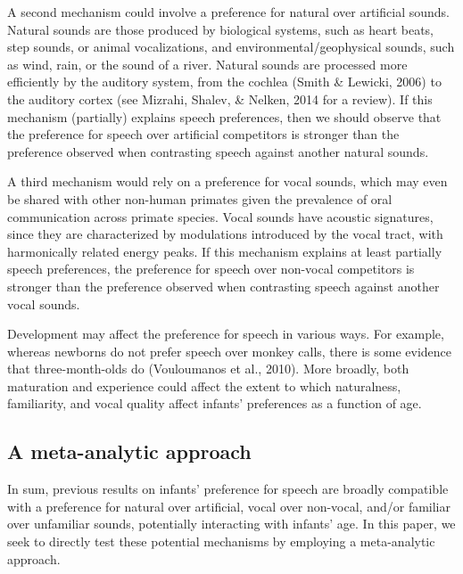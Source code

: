 \documentclass[man]{apa6}
\begin{document}
A second mechanism could involve a preference for natural over artificial sounds. Natural sounds are those produced by biological systems, such as heart beats, step sounds, or animal vocalizations, and environmental/geophysical sounds, such as wind, rain, or the sound of a river. Natural sounds are processed more efficiently by the auditory system, from the cochlea (Smith \& Lewicki, 2006) to the auditory cortex (see Mizrahi, Shalev, \& Nelken, 2014 for a review). If this mechanism (partially) explains speech preferences, then we should observe that the preference for speech over artificial competitors is stronger than the preference observed when contrasting speech against another natural sounds.

A third mechanism would rely on a preference for vocal sounds, which may even be shared with other non-human primates given the prevalence of oral communication across primate species. Vocal sounds have acoustic signatures, since they are characterized by modulations introduced by the vocal tract, with harmonically related energy peaks. If this mechanism explains at least partially speech preferences, the preference for speech over non-vocal competitors is stronger than the preference observed when contrasting speech against another vocal sounds.

Development may affect the preference for speech in various ways. For example, whereas newborns do not prefer speech over monkey calls, there is some evidence that three-month-olds do (Vouloumanos et al., 2010). More broadly, both maturation and experience could affect the extent to which naturalness, familiarity, and vocal quality affect infants' preferences as a function of age.

\hypertarget{a-meta-analytic-approach}{%
\subsection{A meta-analytic approach}\label{a-meta-analytic-approach}}

In sum, previous results on infants' preference for speech are broadly compatible with a preference for natural over artificial, vocal over non-vocal, and/or familiar over unfamiliar sounds, potentially interacting with infants' age. In this paper, we seek to directly test these potential mechanisms by employing a meta-analytic approach.
\end{document}
